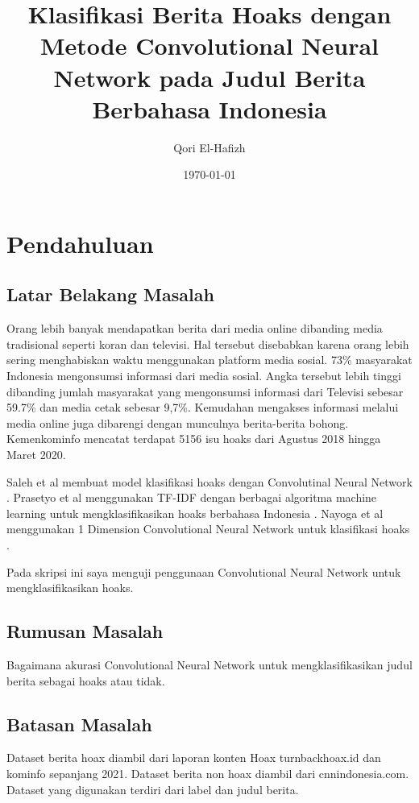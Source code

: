 \documentclass[a4paper,12pt]{report}
\title{Klasifikasi Berita Hoaks dengan Metode Convolutional Neural Network pada Judul Berita Berbahasa Indonesia}
\author{Qori El-Hafizh}
\date{\today}
\begin{document}
\maketitle

\begin{abstract}
\end{abstract}

\tableofcontents

\chapter{Pendahuluan}
\section{Latar Belakang Masalah}
Orang lebih banyak mendapatkan berita dari media online dibanding media tradisional seperti koran dan televisi.
Hal tersebut disebabkan karena orang lebih sering menghabiskan waktu menggunakan platform media sosial.
73\% masyarakat Indonesia mengonsumsi informasi dari media sosial.
Angka tersebut lebih tinggi dibanding jumlah masyarakat yang mengonsumsi informasi dari Televisi sebesar 59.7\%
dan media cetak sebesar 9,7\%. \cite*{katadata_73_nodate}
Kemudahan mengakses informasi melalui media online juga dibarengi dengan munculnya berita-berita bohong.
Kemenkominfo mencatat terdapat 5156 isu hoaks dari Agustus 2018 hingga Maret 2020. \cite*{kominfo_detail_nodate}

Saleh et al membuat model klasifikasi hoaks dengan Convolutinal Neural Network \cite*{saleh_opcnn-fake_2021}.
Prasetyo et al menggunakan TF-IDF dengan berbagai algoritma machine learning untuk mengklasifikasikan hoaks berbahasa Indonesia \cite*{prasetyo_evaluation_2019}.
Nayoga et al menggunakan 1 Dimension Convolutional Neural Network untuk klasifikasi hoaks \cite*{nayoga_hoax_2021}.

Pada skripsi ini saya menguji penggunaan Convolutional Neural Network untuk mengklasifikasikan hoaks.
\section{Rumusan Masalah}

Bagaimana akurasi Convolutional Neural Network untuk mengklasifikasikan judul berita sebagai hoaks atau tidak.

\section{Batasan Masalah}
Dataset berita hoax diambil dari laporan konten Hoax turnbackhoax.id dan kominfo sepanjang 2021.
Dataset berita non hoax diambil dari cnnindonesia.com.
Dataset yang digunakan terdiri dari label dan judul berita.
\end{document}

